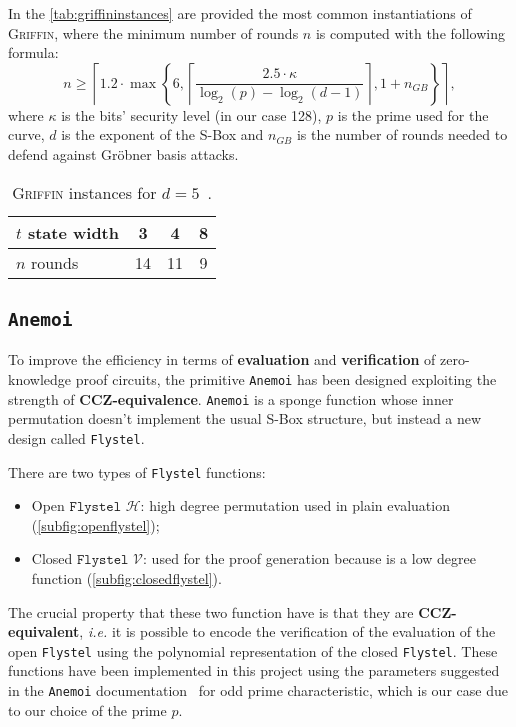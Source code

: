 \documentclass[12pt, a4paper]{report}
\begin{document}
In the \autoref{tab:griffininstances} are provided the most common instantiations of \textsc{Griffin}, where the minimum number of rounds $n$ is computed with the following formula:
\begin{equation}
  n \ge \left\lceil 1.2 \cdot \max \left\{6, \left\lceil \frac{2.5 \cdot \kappa}{\log_2(p) - \log_2(d-1)} \right\rceil, 1 + n_{GB} \right\} \right\rceil ,
  \label{eq:griffinrounds}
\end{equation}
where $\kappa$ is the bits' security level (in our case 128), $p$ is the prime used for the curve, $d$ is the exponent of the S-Box and $n_{GB}$ is the number of rounds needed to defend against Gr\"obner basis attacks.

\begin{table}[H]
  \caption{\textsc{Griffin} instances for $d = 5$~\cite[Tab.~2]{griffin}.}\label{tab:griffininstances}
  \begin{center}
    \begin{tabular}{|l|c|c|c|}
      \hline
      $t$ state width & 3 & 4 & 8 \\
      \hline
      $n$ rounds & 14 & 11 & 9 \\
      \hline
    \end{tabular}
  \end{center}
\end{table}

\subsection{\texttt{Anemoi}}\label{subsec:anemoi}

To improve the efficiency in terms of \textbf{evaluation} and \textbf{verification} of zero-knowledge proof circuits, the primitive \texttt{Anemoi} has been designed exploiting the strength of \textbf{CCZ-equivalence}.
\texttt{Anemoi} is a sponge function whose inner permutation doesn't implement the usual S-Box structure, but instead a new design called \texttt{Flystel}.

There are two types of \texttt{Flystel} functions:
\begin{itemize}
  \item Open $\texttt{Flystel}$ $\mathcal{H}$: high degree permutation used in plain evaluation (\autoref{subfig:openflystel});
  \item Closed $\texttt{Flystel}$ $\mathcal{V}$: used for the proof generation because is a low degree function (\autoref{subfig:closedflystel}).
\end{itemize}
The crucial property that these two function have is that they are \textbf{CCZ-equivalent}, \textsl{i.e.} it is possible to encode the verification of the evaluation of the open \texttt{Flystel} using the polynomial representation of the closed \texttt{Flystel}.
These functions have been implemented in this project using the parameters suggested in the \texttt{Anemoi} documentation~\cite[Sec.~4.4]{anemoi} for odd prime characteristic, which is our case due to our choice of the prime $p$.
\end{document}

